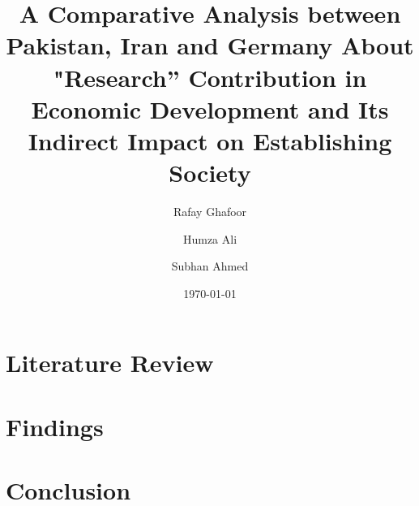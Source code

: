 \documentclass[]{article}
\title{A Comparative Analysis between Pakistan, Iran and Germany About "Research” Contribution in Economic Development and Its Indirect Impact on Establishing Society}
\date{\today}
\author[1]{Rafay Ghafoor}
\author[2]{Humza Ali}
\author[3]{Subhan Ahmed}
\affil[1]{Department of Computer Science, FAST NUCES}
\begin{document}
\begin{titlingpage}
\maketitle
\end{titlingpage}

\tableofcontents
\newpage

\section{Literature Review}
\section{Findings}
\section{Conclusion}
\end{document}
